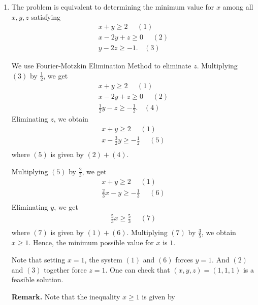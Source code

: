 \begin{enumerate}
\def\labelenumi{\arabic{enumi}.}
\item
  The problem is equivalent to determining the minimum value for \(x\)
  among all \(x,y,z\) satisfying \[
  \begin{array}{r}
   x + y  \geq 2 ~~~~~~(1)\\
   x - 2y + z \geq 0~~~~~~(2) \\
      y - 2z \geq -1.~~~~(3)
  \end{array}
  \]

  We use Fourier-Motzkin Elimination Method to eliminate \(z\).
  Multiplying \((3)\) by \(\frac{1}{2}\), we get \[
  \begin{array}{r}
   x + y  \geq 2 ~~~~~~(1)\\
   x - 2y + z \geq 0~~~~~~(2) \\
      \frac{1}{2}y - z \geq -\frac{1}{2}.~~~~(4)
  \end{array}
  \] Eliminating \(z\), we obtain \[
  \begin{array}{r}
   x + y  \geq 2 ~~~~~~(1)\\
   x - \frac{3}{2}y \geq -\frac{1}{2}~~~~~~(5) \\
  \end{array}
  \] where \((5)\) is given by \((2) + (4)\).

  Multiplying \((5)\) by \(\frac{2}{3}\), we get \[
  \begin{array}{r}
   x + y  \geq 2 ~~~~~~(1)\\
  \frac{2}{3} x - y \geq -\frac{1}{3}~~~~~~(6) \\
  \end{array}
  \] Eliminating \(y\), we get \[
  \begin{array}{r}
  \frac{5}{3} x  \geq \frac{5}{3} ~~~~~~(7)\\
  \end{array}
  \] where \((7)\) is given by \((1) + (6)\). Multiplying \((7)\) by
  \(\frac{3}{5}\), we obtain \(x \geq 1\). Hence, the minimum possible
  value for \(x\) is \(1\).

  Note that setting \(x = 1\), the system \((1)\) and \((6)\) forces
  \(y = 1.\) And \((2)\) and \((3)\) together force \(z = 1.\) One can
  check that \((x,y,z) = (1,1,1)\) is a feasible solution.

  \textbf{Remark.} Note that the inequality \(x \geq 1\) is given by


\end{enumerate}
